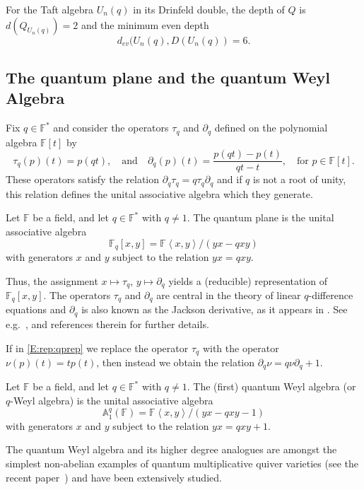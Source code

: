 \documentclass{commat}
\newcommand{\FF}{\mathbb{F}}
\newcommand{\wa}[1][1]{\mathbb{A}_{#1}}
\newcommand{\ip}[1]{\left\langle #1\right\rangle}
\begin{document}
\begin{corollary}
	For the Taft algebra $U_n(q)$ in its Drinfeld double, the depth of $Q$ is $d(Q_{U_n(q)}) = 2$ and the minimum even depth $$d_{ev}(U_n(q), D(U_n(q)) = 6.$$
\end{corollary}


\subsection{The quantum plane and the quantum Weyl Algebra}\label{SS:rep:qpqwa}

Fix $q\in\FF^*$ and consider the operators $\tau_q$ and $\partial_q$ defined on the polynomial algebra $\FF[t]$ by
\begin{equation}\label{E:rep:qprep}
	\tau_q (p)(t)=p(qt), \quad \mbox{and} \quad \partial_q (p)(t)=\frac{p(qt)-p(t)}{qt-t}, \quad \mbox{for $p\in\FF[t]$}.
\end{equation}
These operators satisfy the relation $\partial_q\tau_q=q \tau_q\partial_q$ and if $q$ is not a root of unity, this relation defines the unital associative algebra which they generate.

\begin{definition}
	Let $\FF$ be a field, and let $q\in\FF^*$ with $q\neq 1$.  The quantum plane 
	is the unital associative algebra 
	\begin{equation}\label{E:rep:qp:def}
		\FF_q[x, y]=\FF\ip{ x, y}/(yx-qxy)
	\end{equation}
	with generators $x$ and $y$ subject to the relation $yx=qxy$. 
\end{definition}

Thus, the assignment $x\mapsto \tau_q$, $y\mapsto \partial_q$ yields a (reducible) representation of $\FF_q[x, y]$. The operators $\tau_q$ and $\partial_q$ are central in the theory of linear $q$-difference equations and $\partial_q$ is also known as the Jackson derivative, as it appears in \cite{fJ10}. See e.g.\ \cite{yM88}, \cite[Chap.\ IV]{cK95} and references therein for further details.

If in \eqref{E:rep:qprep} we replace the operator $\tau_q$ with the operator $\nu (p)(t)=tp(t)$, then instead we obtain the relation $\partial_q\nu=q\nu\partial_q + 1$.

\begin{definition}
	Let $\FF$ be a field, and let $q\in\FF^*$ with $q\neq 1$.  The (first) quantum Weyl algebra (or $q$-Weyl algebra)
	is the unital associative algebra 
	\begin{equation}
		\wa^q(\FF)=\FF\ip{ x, y}/(yx-qxy-1)
	\end{equation}
	with generators $x$ and $y$ subject to the relation $yx=qxy+1$. 
\end{definition}
The quantum Weyl algebra and its higher degree analogues are amongst the simplest non-abelian examples of quantum multiplicative quiver varieties (see the recent paper~\cite{CGJ20}) and have been extensively studied.
\end{document}
